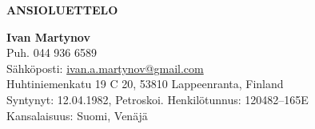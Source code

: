 \documentclass[a4paper]{article}
\begin{document}
\begin{center}
\Large{\bf{ANSIOLUETTELO}}
\end{center}

\begin{flushleft}
  \textbf{Ivan Martynov}\\
  Puh. 044 936 6589\\
  S\"ahk\"oposti: \href{ivan.a.martynov@gmail.com}{ivan.a.martynov@gmail.com}\\
  Huhtiniemenkatu 19 C 20, 53810 Lappeenranta, Finland\\
  Syntynyt: 12.04.1982, Petroskoi. Henkil\"otunnus: 120482--165E\\
  Kansalaisuus: Suomi, Ven\"aj\"a
\end{flushleft}
\vspace{-10pt}
\end{document}
